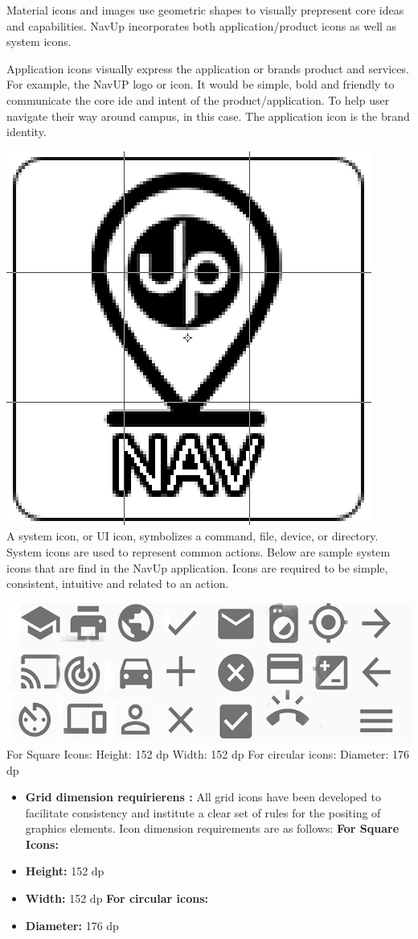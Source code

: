 \documentclass[11pt]{article}
\begin{document}
 Material icons and images use geometric shapes to visually prepresent core ideas and capabilities. NavUp incorporates both application/product icons as well as system icons. \newline

Application icons visually express the application or brands product and services. For example, the NavUP logo or icon. It would be simple, bold and friendly to communicate the core ide and intent of the product/application. To help user navigate their way around campus, in this case. The application icon is the brand identity.

	\includegraphics[width=0.2\linewidth]{Images/gridUP.png}\\[1cm]
	
	A system icon, or UI icon, symbolizes a command, file, device, or directory. System icons are used to represent common actions. Below are sample system icons that are find in the NavUp application. Icons are required to be simple, consistent, intuitive and related to an action.\newline
	
	\includegraphics[width=0.2\linewidth]{Images/icons.png}\\[1cm]
	
	
	For Square Icons:
	Height: 152 dp
	Width: 152 dp
	For circular icons:
	Diameter: 176 dp
	
	\begin{itemize}
		\item\textbf {Grid dimension requirierens :} \newline
		All grid icons have been developed to facilitate consistency and institute a clear set of rules for the positing of graphics elements. Icon dimension requirements are as follows:\newline \newline
		 \textbf{For Square Icons:} 
		\item \textbf{Height:} 152 dp
		\item \textbf{Width:} 152 dp \newline \newline
	\textbf{For circular icons:} 
		\item \textbf{Diameter:} 176 dp
	\end{itemize}
	
\end{document}
